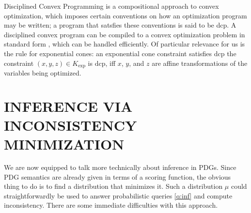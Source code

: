 \documentclass[twoside]{article}
\begin{document}
Disciplined Convex Programming \parencite{dcp-thesis} is a
    compositional approach to convex optimization, which imposes certain conventions on how an optimization program may be written; a program that satsfies these conventions is said to be dcp. 
A disciplined convex program can be compiled to a convex optimization problem in standard form \parencite{agrawal2018rewriting}, which can be handled efficiently.
Of particular relevance for us is the rule for 
exponential cones: an exponential cone constraint satisfies dcp 
the constraint $(x,y,z) \in K_{\exp}$ is dcp, iff $x$, $y$, and $z$ are affine transformations of the variables being optimized. 



\section{INFERENCE VIA INCONSISTENCY MINIMIZATION}
    \label{sec:inf-via-inc}

We are now equipped to talk more technically about inference in PDGs. 
Since PDG semantics are already given in terms of a scoring function,
the obvious thing to do is to find a distribution that minimizes it.
Such a distribution $\mu$ could straightforwardly be used to answer probabilistic queries \eqref{q:inf} and compute inconsistency.  
There are some immediate difficulties with this approach.
\end{document}

